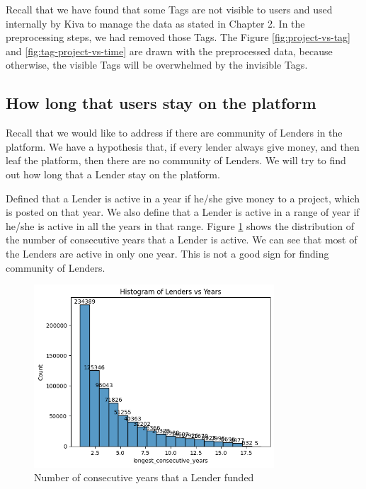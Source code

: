 Recall that we have found that some Tags are not visible to users and used internally by Kiva to manage the data as stated in Chapter 2.
In the preprocessing steps, we had removed those Tags.
The Figure \ref{fig:project-vs-tag} and \ref{fig:tag-project-vs-time}
are drawn with the preprocessed data,
because otherwise, the visible Tags will be overwhelmed by the invisible Tags.





\subsection{How long that users stay on the platform}

Recall that we would like to address if there are community of Lenders in the platform.
We have a hypothesis that, if every lender always give money, and then leaf the platform,
then there are no community of Lenders.
We will try to find out how long that a Lender stay on the platform.

Defined that a Lender is active in a year if he/she give money to a project, which is posted on that year.
We also define that a Lender is active in a range of year if he/she is active in all the years in that range.
Figure \ref{fig:active-hist} shows the distribution of the number of consecutive years that a Lender is active.
We can see that most of the Lenders are active in only one year.
This is not a good sign for finding community of Lenders.


\begin{figure}[H]
	\centering
	\includegraphics[width=0.8\textwidth]{images/active-hist.png}
	\caption{Number of consecutive years that a Lender funded}
	\label{fig:active-hist}
\end{figure}

